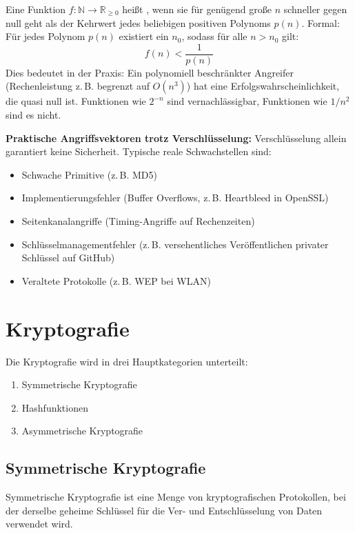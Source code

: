 \documentclass[
../../css_summary.tex,
]
{subfiles}
\begin{document}
\begin{defbox}
   Eine Funktion $f: \mathbb{N} \to \mathbb{R}_{\ge 0}$ heißt , wenn sie für genügend große $n$ schneller gegen null geht als der Kehrwert jedes beliebigen positiven Polynoms $p(n)$.
   Formal: Für jedes Polynom $p(n)$ existiert ein $n_0$, sodass für alle $n > n_0$ gilt:
   \[ f(n) < \frac{1}{p(n)} \]
   Dies bedeutet in der Praxis: Ein polynomiell beschränkter Angreifer (Rechenleistung z.\,B. begrenzt auf $O(n^3)$) hat eine Erfolgswahrscheinlichkeit, die quasi null ist. Funktionen wie $2^{-n}$ sind vernachlässigbar, Funktionen wie $1/n^2$ sind es nicht.
\end{defbox}

\textbf{Praktische Angriffsvektoren trotz Verschlüsselung:}
Verschlüsselung allein garantiert keine Sicherheit. Typische reale Schwachstellen sind:
\begin{itemize}
   \item Schwache Primitive (z.\,B. MD5)
   \item Implementierungsfehler (Buffer Overflows, z.\,B. Heartbleed in OpenSSL)
   \item Seitenkanalangriffe (Timing-Angriffe auf Rechenzeiten)
   \item Schlüsselmanagementfehler (z.\,B. versehentliches Veröffentlichen privater Schlüssel auf GitHub)
   \item Veraltete Protokolle (z.\,B. WEP bei WLAN)
\end{itemize}

\section{Kryptografie}
Die Kryptografie wird in drei Hauptkategorien unterteilt:
\begin{enumerate}
   \item Symmetrische Kryptografie
   \item Hashfunktionen
   \item Asymmetrische Kryptografie
\end{enumerate}

\subsection{Symmetrische Kryptografie}
Symmetrische Kryptografie ist eine Menge von kryptografischen Protokollen, bei der derselbe geheime Schlüssel für die Ver- und Entschlüsselung von Daten verwendet wird.
\end{document}
